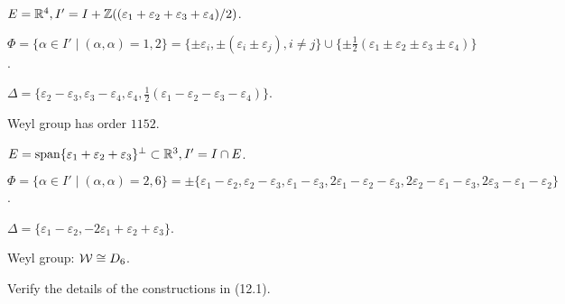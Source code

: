 \begin{exam}[$F_4$]
  $E={\mathbb R}^4, I'=I+{\mathbb Z}((\varepsilon_1+\varepsilon_2+\varepsilon_3+\varepsilon_4)/2)$.

  $\Phi=\{\alpha\in I'\mid (\alpha,\alpha)=1, 2\}=\{\pm\varepsilon_i, \pm(\varepsilon_i\pm\varepsilon_j), i\neq j\}\cup\{\pm\frac{1}{2}(\varepsilon_1\pm\varepsilon_2\pm\varepsilon_3\pm\varepsilon_4)\}$.

  $\Delta=\{\varepsilon_2-\varepsilon_3, \varepsilon_3-\varepsilon_4, \varepsilon_4, \frac{1}{2}(\varepsilon_1-\varepsilon_2-\varepsilon_3-\varepsilon_4)\}$.

  Weyl group has order $1152$.
\end{exam}

\begin{exam}[$G_2$]
  $E=\operatorname{span}\{\varepsilon_1+\varepsilon_2+\varepsilon_3\}^{\perp}\subset{\mathbb R}^3, I'=I\cap E$.

  $\Phi=\{\alpha\in I'\mid (\alpha,\alpha)=2,6\}=\pm\{ \varepsilon_1-\varepsilon_2, \varepsilon_2-\varepsilon_3, \varepsilon_1-\varepsilon_3, 2\varepsilon_1-\varepsilon_2-\varepsilon_3, 2\varepsilon_2-\varepsilon_1-\varepsilon_3, 2\varepsilon_3-\varepsilon_1-\varepsilon_2 \}$.

  $\Delta=\{ \varepsilon_1-\varepsilon_2, -2\varepsilon_1+\varepsilon_2+\varepsilon_3 \}$.

  Weyl group: ${\cal W}\cong D_6$.
\end{exam}

\begin{ex}
  Verify the details of the constructions in (12.1).
\end{ex}

